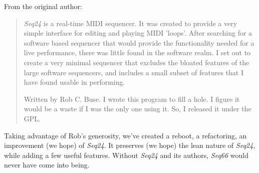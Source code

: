    From the original author:

   \begin{quotation}
      \textsl{Seq24} is a real-time MIDI sequencer. It was created to
      provide a very simple interface for editing and playing MIDI 'loops'.
      After searching for a software based sequencer that would provide the
      functionality needed for a live performance, there was little found in
      the software realm. I set out to create a very minimal sequencer that
      excludes the bloated features of the large software sequencers, and
      includes a small subset of features that I have found usable in
      performing. 

      Written by Rob C. Buse.  I wrote this program to fill a
      hole.  I figure it would be a waste if I was the only one
      using it.  So, I released it under the GPL.
   \end{quotation}

   Taking advantage of Rob's generosity,
   we've created a reboot, a refactoring, an improvement (we hope) of
   \textsl{Seq24}.  It preserves (we hope) the lean nature of \textsl{Seq24},
   while adding a few useful features.
   Without \textsl{Seq24} and its authors,
   \textsl{Seq66} would never have come into being.

